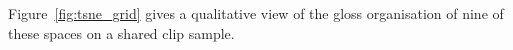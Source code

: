 Figure~\ref{fig:tsne_grid} gives a qualitative view of the gloss
organisation of nine of these spaces on a shared clip sample.
